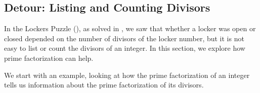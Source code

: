 \newcommand{\subcountdiv}{Detour: Listing and Counting Divisors}
\subsection{\subcountdiv}
\label{sub_count_divisors}

In the Lockers Puzzle (), as solved in , we saw that whether a locker was open or closed depended on the number of divisors of the locker number, but it is not easy to list or count the divisors of an integer.  In this section, we explore how prime factorization can help.  

We start with an example, looking at how the prime factorization of an integer tells us information about the prime factorization of its divisors.

